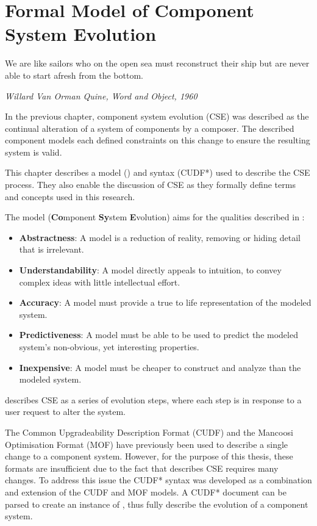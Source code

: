 \chapter{Formal Model of Component System Evolution}
\label{formal}
\epigraph{We are like sailors who on the open sea must reconstruct their ship but are never able to start afresh from the bottom.}
{\textit{Willard Van Orman Quine, Word and Object, 1960}}
In the previous chapter, component system evolution (CSE) was described as the continual alteration of a system of components by a composer.
The described component models each defined constraints on this change to ensure the resulting system is valid.

This chapter describes a model (\modelname) and syntax (CUDF*) used to describe the CSE process. 
They also enable the discussion of CSE as they formally define terms and concepts used in this research.

The model \modelname (\textbf{Co}mponent \textbf{Sy}stem \textbf{E}volution) aims for the qualities described in \citep{Selic2003}:
\begin{itemize}
  \item \textbf{Abstractness}: A model is a reduction of reality, removing or hiding detail that is irrelevant.
  \item \textbf{Understandability}: A model directly appeals to intuition, to convey complex ideas with little intellectual effort.
  \item \textbf{Accuracy}: A model must provide a true to life representation of the modeled system.
  \item \textbf{Predictiveness}: A model must be able to be used to predict the modeled system's non-obvious, yet interesting properties.
  \item \textbf{Inexpensive}: A model must be cheaper to construct and analyze than the modeled system.
\end{itemize}
\modelname describes CSE as a series of evolution steps, where each step is in response to a user request to alter the system. 

The Common Upgradeability Description Format (CUDF) \citep{treinen2009common} 
and the Mancoosi Optimisation Format (MOF) \citep{abate2011} have previously been used to describe a single change to a component system.
However, for the purpose of this thesis, these formats are insufficient due to the fact that \modelname describes CSE requires many changes.
To address this issue the CUDF* syntax was developed as a combination and extension of the CUDF and MOF models.
A CUDF* document can be parsed to create an instance of \modelname, thus fully describe the evolution of a component system.

